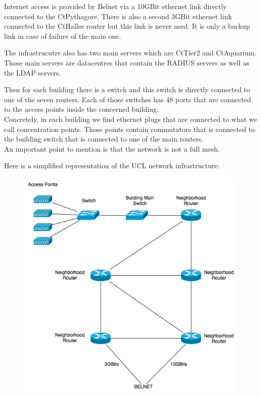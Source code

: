 Internet access is provided by Belnet via a 10GBit ethernet link directly connected to the CtPythagore. There is also a second 3GBit ethernet link connected to the CtHalles router but this link is never used. It is only a backup link in case of failure of the main one.

The infrastrucutre also has two main servers which are CtTier2 and CtAquarium. Those main servers are datacentres that contain the RADIUS servers as well as the LDAP servers.

Then for each building there is a switch and this switch is directly connected to one of the seven routers. Each of those switches has 48 ports that are connected to the access points inside the concerned building.\\
Concretely, in each building we find ethernet plugs that are connected to what we call concentration points. Those points contain commutators that is connected to the building switch that is connected to one of the main routers.\\
An important point to mention is that the network is not a full mesh.

Here is a simplified representation of the UCL network infrastructure:
\begin{figure}[H]
	\includegraphics[width=.9\linewidth]{Pictures/Chapter2/infrastructure.png}
\end{figure}




